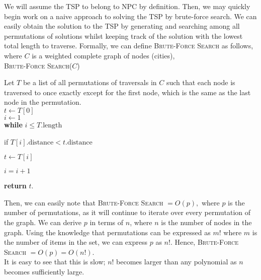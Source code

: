 \documentclass{article}
\begin{document}
We will assume the TSP to belong to NPC by definition. Then, we may quickly begin work on a naive approach to solving the TSP by brute-force search. We can easily obtain the solution to  the TSP by generating and searching among all permutations of solutions whilst keeping track of the solution with the lowest total length to traverse. Formally, we can define \textsc{Brute-Force Search} as follows, where $C$ is a weighted complete graph of nodes (cities),\\

\noindent
\textsc{Brute-Force Search}($C$)
\begin{adjustwidth}{2.5em}{0pt}
Let $T$ be a list of all permutations of traversals in $C$ such that each node is traversed to once exactly except for the first node, which is the same as the last node in the permutation.\\
$t \longleftarrow T[0]$\\
$i \longleftarrow 1$\\
\textbf{while} $i \leq T.\text{length}$
	\begin{adjustwidth}{2.5em}{0pt}
	if $T[i].\text{distance} < t.\text{distance}$
		\begin{adjustwidth}{2.5em}{0pt}
		$t \longleftarrow T[i]$
		\end{adjustwidth}
	$i = i + 1$
	\end{adjustwidth}
\textbf{return} $t$.
\end{adjustwidth}

\noindent
Then, we can easily note that \textsc{Brute-Force Search} $= O(p),$ where $p$ is the number of permutations, as it will continue to iterate over every permutation of the graph. We can derive $p$ in terms of $n$, where $n$ is the number of nodes in the graph. Using the knowledge that permutations can be expressed as $m!$ where $m$ is the number of items in the set, we can express $p$ as $n!$. Hence, \textsc{Brute-Force Search} $= O(p) = O(n!)$.\\
It is easy to see that this is slow; $n!$ becomes larger than any polynomial as $n$ becomes sufficiently large.
\end{document}

